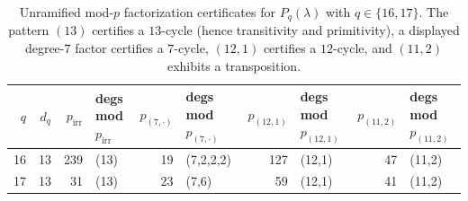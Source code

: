 \begin{table}[H]
\centering
\scriptsize
\caption{Unramified mod-$p$ factorization certificates for $P_q(\lambda)$ with $q\in\{16,17\}$. The pattern $(13)$ certifies a $13$-cycle (hence transitivity and primitivity), a displayed degree-$7$ factor certifies a $7$-cycle, $(12,1)$ certifies a $12$-cycle, and $(11,2)$ exhibits a transposition.}
\label{tab:fold_collision_moment_charpoly_galois_certificate_q16_17}
\begin{tabular}{r r r l r l r l r l}
\toprule
$q$ & $d_q$ & $p_{\mathrm{irr}}$ & degs mod $p_{\mathrm{irr}}$ & $p_{(7,\cdot)}$ & degs mod $p_{(7,\cdot)}$ & $p_{(12,1)}$ & degs mod $p_{(12,1)}$ & $p_{(11,2)}$ & degs mod $p_{(11,2)}$\\
\midrule
16 & 13 & 239 & (13) & 19 & (7,2,2,2) & 127 & (12,1) & 47 & (11,2)\\
17 & 13 & 31 & (13) & 23 & (7,6) & 59 & (12,1) & 41 & (11,2)\\
\bottomrule
\end{tabular}
\end{table}
